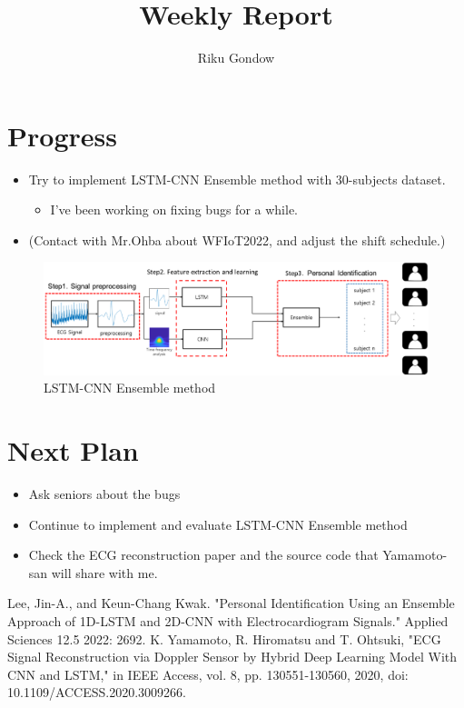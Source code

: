 \documentclass[dvipdfmx]{article}
\begin{document}
\title{Weekly Report}
\author{Riku Gondow}
\maketitle
\section{Progress}
\begin{itemize}
    \item Try to implement LSTM-CNN Ensemble method with 30-subjects dataset.\cite{lstm}
    \begin{itemize}
        \item I've been working on fixing bugs for a while.
    \end{itemize}

    \item (Contact with Mr.Ohba about WFIoT2022, and adjust the shift schedule.)
\end{itemize}

\begin{figure}[H]
    \begin{center}
    \includegraphics[width=\linewidth]{./img/LSTM-CNN.png}
    \end{center}
    \caption{LSTM-CNN Ensemble method}
\end{figure}

\section{Next Plan}
\begin{itemize}
    \item Ask seniors about the bugs
    \item Continue to implement and evaluate LSTM-CNN Ensemble method
    \item Check the ECG reconstruction paper\cite{ECG} and the source code that Yamamoto-san will share with me.
\end{itemize}

\begin{thebibliography}{99}
 Lee, Jin-A., and Keun-Chang Kwak. "Personal Identification Using an Ensemble Approach of 1D-LSTM and 2D-CNN with Electrocardiogram Signals." Applied Sciences 12.5 2022: 2692.
 K. Yamamoto, R. Hiromatsu and T. Ohtsuki, "ECG Signal Reconstruction via Doppler Sensor by Hybrid Deep Learning Model With CNN and LSTM," in IEEE Access, vol. 8, pp. 130551-130560, 2020, doi: 10.1109/ACCESS.2020.3009266.
\end{thebibliography}
\end{document}
